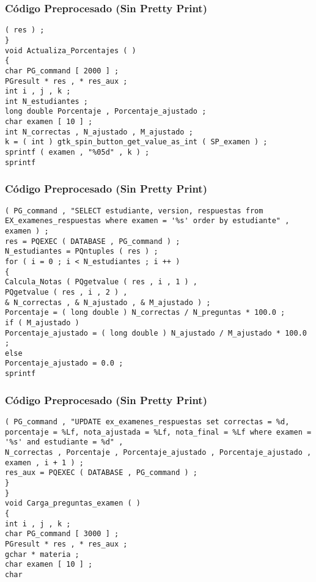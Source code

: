 \documentclass{beamer}
\begin{document}
\begin{frame}[fragile]
\frametitle{C\'odigo Preprocesado (Sin Pretty Print)}
\begin{lstlisting}[style=CStyle]
( res ) ; 
} 
void Actualiza_Porcentajes ( ) 
{ 
char PG_command [ 2000 ] ; 
PGresult * res , * res_aux ; 
int i , j , k ; 
int N_estudiantes ; 
long double Porcentaje , Porcentaje_ajustado ; 
char examen [ 10 ] ; 
int N_correctas , N_ajustado , M_ajustado ; 
k = ( int ) gtk_spin_button_get_value_as_int ( SP_examen ) ; 
sprintf ( examen , "%05d" , k ) ; 
sprintf \end{lstlisting}
\end{frame}
\begin{frame}[fragile]
\frametitle{C\'odigo Preprocesado (Sin Pretty Print)}
\begin{lstlisting}[style=CStyle]
( PG_command , "SELECT estudiante, version, respuestas from EX_examenes_respuestas where examen = '%s' order by estudiante" , examen ) ; 
res = PQEXEC ( DATABASE , PG_command ) ; 
N_estudiantes = PQntuples ( res ) ; 
for ( i = 0 ; i < N_estudiantes ; i ++ ) 
{ 
Calcula_Notas ( PQgetvalue ( res , i , 1 ) , 
PQgetvalue ( res , i , 2 ) , 
& N_correctas , & N_ajustado , & M_ajustado ) ; 
Porcentaje = ( long double ) N_correctas / N_preguntas * 100.0 ; 
if ( M_ajustado ) 
Porcentaje_ajustado = ( long double ) N_ajustado / M_ajustado * 100.0 ; 
else 
Porcentaje_ajustado = 0.0 ; 
sprintf \end{lstlisting}
\end{frame}
\begin{frame}[fragile]
\frametitle{C\'odigo Preprocesado (Sin Pretty Print)}
\begin{lstlisting}[style=CStyle]
( PG_command , "UPDATE ex_examenes_respuestas set correctas = %d, porcentaje = %Lf, nota_ajustada = %Lf, nota_final = %Lf where examen = '%s' and estudiante = %d" , 
N_correctas , Porcentaje , Porcentaje_ajustado , Porcentaje_ajustado , 
examen , i + 1 ) ; 
res_aux = PQEXEC ( DATABASE , PG_command ) ; 
} 
} 
void Carga_preguntas_examen ( ) 
{ 
int i , j , k ; 
char PG_command [ 3000 ] ; 
PGresult * res , * res_aux ; 
gchar * materia ; 
char examen [ 10 ] ; 
char \end{lstlisting}
\end{frame}
\end{document}
